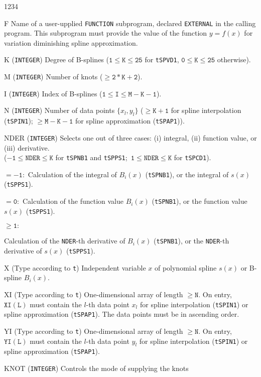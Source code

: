 \begin{DLtt}{1234}
\item[F] Name of a user-upplied {\tt FUNCTION} subprogram,
declared {\tt EXTERNAL} in the calling program.
This subprogram must provide the value of the function $y = f(x)$
for variation diminishing spline approximation.
\item[K]  ({\tt INTEGER}) Degree of B-splines
($\mathtt{1 \le K \le 25}$ for {\tt tSPVD1},
 $\mathtt{0 \le K \le 25}$ otherwise).
\item[M]  ({\tt INTEGER}) Number of knots ($\mathtt{\ge 2*K+2}$).
\item[I]  ({\tt INTEGER}) Index of B-splines
 ($\mathtt{1 \le I \le M-K-1}$).
\item[N] ({\tt INTEGER}) Number of data points $\{x_l,y_l\}$
($\mathtt{\ge K+1}$ for spline interpolation ({\tt tSPIN1});
$\mathtt{\ge M-K-1}$ for spline approximation ({\tt tSPAP1})).
\item[NDER] ({\tt INTEGER}) Selects one out of
three cases: (i) integral, (ii) function value, or (iii) derivative. \\
($\mathtt{-1 \le NDER \le K}$ for {\tt tSPNB1} and {\tt tSPPS1};\,
 $\mathtt{1 \le NDER \le K}$ for {\tt tSPCD1}).
\item[]$\mathtt{=-1:}$  Calculation of the integral of $B_i(x)$
({\tt tSPNB1}), or the integral of $s(x)$ ({\tt tSPPS1}).
\item[] $\mathtt{=0:}$ Calculation of the function value $B_i(x)$
({\tt tSPNB1}), or the function value $s(x)$ ({\tt tSPPS1}).
\item[] $\mathtt{\ge 1:}$ \parbox[t]{140mm}{
 Calculation of the {\tt NDER}-th derivative of $B_i(x)$ ({\tt tSPNB1}),
 or the {\tt NDER}-th derivative of $s(x)$ ({\tt tSPPS1}).}
\item[X]  (Type according to {\tt t}) Independent variable $x$ of
 polynomial spline $s(x)$ or B-spline $B_i(x)$.
\item[XI] (Type according to {\tt t}) One-dimensional array of length
 $\mathtt{\ge N}$. On entry, $\mathtt{XI(L)}$ must contain the $l$-th
 data point $x_l$ for spline interpolation ({\tt tSPIN1}) or spline
 approximation ({\tt tSPAP1}). The data points must be in
 ascending order.
\item[YI] (Type according to {\tt t}) One-dimensional array of length
 $\mathtt{\ge N}$. On entry, $\mathtt{YI(L)}$ must contain the $l$-th
 data point $y_l$ for spline interpolation ({\tt tSPIN1}) or spline
 approximation ({\tt tSPAP1}).
\item[KNOT] ({\tt INTEGER}) Controls the mode of supplying the knots

\end{DLtt}
